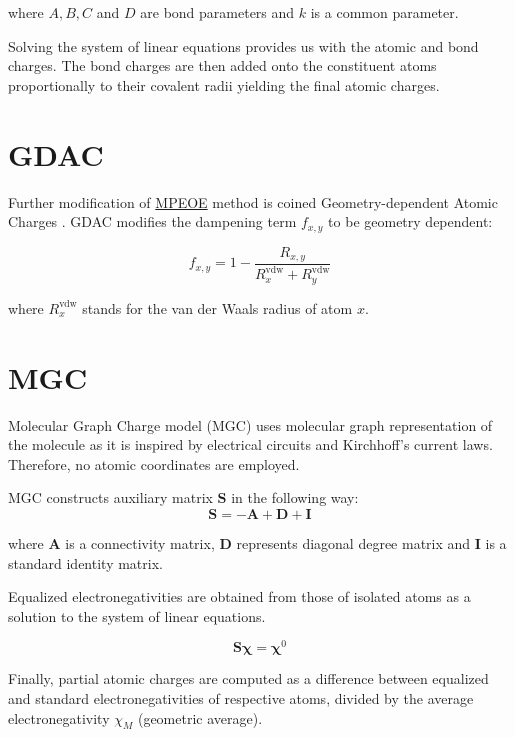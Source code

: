 \documentclass[oneside]{memoir}
\newcommand\ddfrac[2]{\frac{\displaystyle #1}{\displaystyle #2}}
\begin{document}
where $A, B, C$ and $D$ are bond parameters and $k$ is a common parameter.

Solving the system of linear equations provides us with the atomic and bond charges. The bond charges are then added onto the constituent atoms proportionally to their covalent radii yielding the final atomic charges.

\section*{GDAC}
\label{sec:methods_gdac}

Further modification of \hyperref[sec:methods_mpeoe]{MPEOE} method is coined Geometry-dependent Atomic Charges \cite{Cho2001}. GDAC modifies the dampening term $f_{x, y}$ to be geometry dependent:

\begin{equation}
f_{x, y} = 1 - \ddfrac{R_{x, y}}{R_x^{\text{vdw}} + R_y^{\text{vdw}}}
\end{equation}

where $R^{\text{vdw}}_x$ stands for the van der Waals radius of atom $x$.

\section*{MGC}
\label{sec:methods_mgc}

Molecular Graph Charge model (MGC) \cite{Oliferenko2000, Oliferenko2001} uses molecular graph representation of the molecule as it is inspired by electrical circuits and Kirchhoff's current laws. Therefore, no atomic coordinates are employed.

MGC constructs auxiliary matrix $\bm{S}$ in the following way:
\begin{equation}
\label{eq:mgc_main}
\bm{S} = -\bm{A} + \bm{D} + \bm{I}
\end{equation}

where $\bm{A}$ is a connectivity matrix, $\bm{D}$ represents diagonal degree matrix and $\bm{I}$ is a standard identity matrix.

Equalized electronegativities are obtained from those of isolated atoms as a solution to the system of linear equations.

\begin{equation}
\label{eq:mgc_system}
\bm{S\chi} = \bm{\chi}^0
\end{equation}

Finally, partial atomic charges are computed as a difference between equalized and standard electronegativities of respective atoms, divided by the average electronegativity $\chi_M$ (geometric average).
\end{document}
